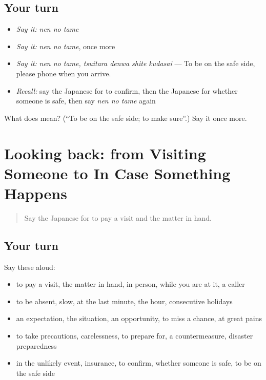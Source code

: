 \subsection*{Your turn}
\begin{itemize}
\raggedright
  \item \emph{Say it:} \emph{nen no tame}
  \item \emph{Say it:} \emph{nen no tame}, once more
  \item \emph{Say it:} \emph{nen no tame, tsuitara denwa shite kudasai} — To be on the safe side, please phone when you arrive.
  \item \emph{Recall:} say the Japanese for to confirm, then the Japanese for whether someone is safe, then say \emph{nen no tame} again
\end{itemize}

\begin{tcolorbox}[breakable,colback=teal!4,colframe=teal!35!black,title={Before you move on}]
What does  mean? (\textquotedblleft{}To be on the safe side; to make sure\textquotedblright{}.) Say it once more.
\end{tcolorbox}
\section[(dialogue)]{Looking back: from Visiting Someone to In Case Something Happens}

\label{lesson:JA-R351-review-347-351}



\begin{quote}
Say the Japanese for to pay a visit and the matter in hand.
\end{quote}

\subsection*{Your turn}
Say these aloud:

\begin{itemize}
\raggedright
  \item to pay a visit, the matter in hand, in person, while you are at it, a caller
  \item to be absent, slow, at the last minute, the hour, consecutive holidays
  \item an expectation, the situation, an opportunity, to miss a chance, at great pains
  \item to take precautions, carelessness, to prepare for, a countermeasure, disaster preparedness
  \item in the unlikely event, insurance, to confirm, whether someone is safe, to be on the safe side
\end{itemize}

